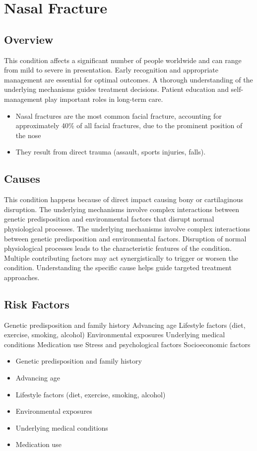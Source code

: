 \chapter{Nasal Fracture}
\label{sec:Nasal Fracture}

\section{Overview}
This condition affects a significant number of people worldwide and can range from mild to severe in presentation. Early recognition and appropriate management are essential for optimal outcomes. A thorough understanding of the underlying mechanisms guides treatment decisions. Patient education and self-management play important roles in long-term care.

\begin{itemize}[noitemsep]
  \item Nasal fractures are the most common facial fracture, accounting for approximately 40\% of all facial fractures, due to the prominent position of the nose
  \item They result from direct trauma (assault, sports injuries, falls).
\end{itemize}
\section{Causes}
This condition happens because of direct impact causing bony or cartilaginous disruption. The underlying mechanisms involve complex interactions between genetic predisposition and environmental factors that disrupt normal physiological processes. The underlying mechanisms involve complex interactions between genetic predisposition and environmental factors. Disruption of normal physiological processes leads to the characteristic features of the condition. Multiple contributing factors may act synergistically to trigger or worsen the condition. Understanding the specific cause helps guide targeted treatment approaches.
\section{Risk Factors}
Genetic predisposition and family history Advancing age Lifestyle factors (diet, exercise, smoking, alcohol) Environmental exposures Underlying medical conditions Medication use Stress and psychological factors Socioeconomic factors

\begin{itemize}[noitemsep]
  \item Genetic predisposition and family history
  \item Advancing age
  \item Lifestyle factors (diet, exercise, smoking, alcohol)
  \item Environmental exposures
  \item Underlying medical conditions
  \item Medication use
\end{itemize}

